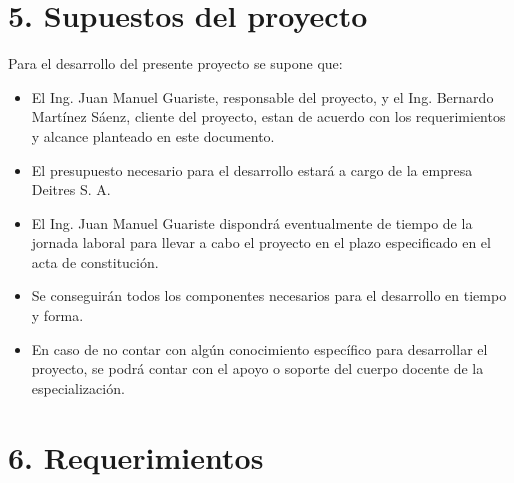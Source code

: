 \documentclass[
11pt, %
]{charter}
\begin{document}
\section{5. Supuestos del proyecto}
\label{sec:supuestos}


Para el desarrollo del presente proyecto se supone que: 

\begin{itemize}
	\item El Ing. Juan Manuel Guariste, responsable del proyecto, y el Ing. Bernardo Martínez Sáenz, cliente del proyecto, estan de acuerdo con los requerimientos y 		alcance planteado en este documento.
	\item El presupuesto necesario para el desarrollo estará a cargo de la empresa Deitres S. A.
	\item El Ing. Juan Manuel Guariste dispondrá eventualmente de tiempo de la jornada laboral para llevar a cabo el proyecto en el plazo especificado en el acta de constitución.
	\item Se conseguirán todos los componentes necesarios para el desarrollo en tiempo y forma.	
	\item En caso de no contar con algún conocimiento específico para desarrollar el proyecto, se podrá contar con el apoyo o soporte del cuerpo docente de la especialización.
\end{itemize}


\section{6. Requerimientos}
\label{sec:requerimientos}
\end{document}
